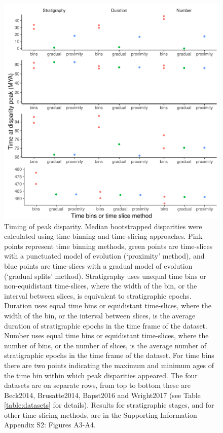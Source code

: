 \documentclass[12pt,a4paper]{article}
\begin{document}
\begin{figure}[!htbp]
    \centering
    \includegraphics[width=1\linewidth, height=1\textheight, keepaspectratio]{figures/fig-peaks-epoch.pdf}
    \caption[Timing of peak disparity for four example datasets.]
    {Timing of peak disparity.
    Median bootstrapped disparities were calculated using time binning and time-slicing approaches. 
    Pink points represent time binning methods, green points are time-slices with a punctuated model of evolution (`proximity' method), and blue points are time-slices with a gradual model of evolution (`gradual splits' method). 
    Stratigraphy uses unequal time bins or non-equidistant time-slices, where the width of the bin, or the interval between slices, is equivalent to stratigraphic epochs. 
    Duration uses equal time bins or equidistant time-slices, where the width of the bin, or the interval between slices, is the average duration of stratigraphic epochs in the time frame of the dataset. 
    Number uses equal time bins or equidistant time-slices, where the number of bins, or the number of slices, is the average number of stratigraphic epochs in the time frame of the dataset. 
    For time bins there are two points indicating the maximum and minimum ages of the time bin within which peak disparities appeared.
    The four datasets are on separate rows, from top to bottom these are Beck2014, Brusatte2014, Bapst2016 and Wright2017 (see Table \ref{table:datasets} for details).
    Results for stratigraphic stages, and for other time-slicing methods, are in the Supporting Information Appendix S2: Figures A3-A4.}
    \label{figure:peak1}
\end{figure}
\end{document}
